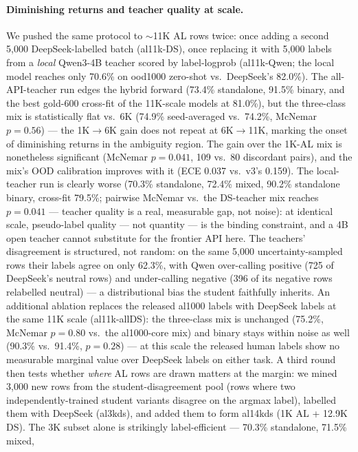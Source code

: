 \documentclass[11pt,a4paper]{article}
\begin{document}
\paragraph{Diminishing returns and teacher quality at scale.} We pushed
the same protocol to $\sim$11K AL rows twice: once adding a second
5{,}000 DeepSeek-labelled batch (al11k-DS), once replacing it with
5{,}000 labels from a \emph{local} Qwen3-4B teacher scored by
label-logprob (al11k-Qwen; the local model reaches only 70.6\% on
ood1000 zero-shot vs.\ DeepSeek's 82.0\%). The all-API-teacher run
edges the hybrid forward (73.4\% standalone, 91.5\% binary, and the
best gold-600 cross-fit of the 11K-scale models at 81.0\%), but the
three-class mix is statistically flat vs.\ 6K (74.9\% seed-averaged
vs.\ 74.2\%, McNemar $p = 0.56$) --- the
1K$\to$6K gain does not repeat at 6K$\to$11K, marking the
onset of diminishing returns in the ambiguity region. The gain over
the 1K-AL mix is nonetheless significant (McNemar $p = 0.041$,
109 vs.\ 80 discordant pairs), and the mix's OOD calibration improves
with it (ECE 0.037 vs.\ v3's 0.159). The local-teacher run is
clearly worse (70.3\% standalone, 72.4\% mixed, 90.2\% standalone
binary, cross-fit 79.5\%; pairwise McNemar vs.\ the DS-teacher mix reaches
$p = 0.041$ --- teacher quality is a real, measurable gap, not noise):
at identical scale, pseudo-label quality --- not
quantity --- is the binding constraint, and a 4B open teacher cannot
substitute for the frontier API here. The teachers' disagreement is
structured, not random: on the same 5{,}000 uncertainty-sampled rows
their labels agree on only 62.3\%, with Qwen over-calling positive
(725 of DeepSeek's neutral rows) and under-calling negative (396 of
its negative rows relabelled neutral) --- a distributional bias the
student faithfully inherits. An additional ablation replaces the
released al1000 labels with DeepSeek labels at the same 11K scale
(al11k-allDS): the three-class mix is unchanged (75.2\%,
McNemar $p = 0.80$ vs.\ the al1000-core mix) and binary stays within
noise as well (90.3\% vs.\ 91.4\%, $p = 0.28$) --- at this scale
the released human labels show no measurable marginal value over
DeepSeek labels on either task. A third round then tests whether \emph{where} AL rows are drawn
matters at the margin: we mined 3{,}000 new rows from the
student-disagreement pool (rows where two independently-trained
student variants disagree on the argmax label), labelled them with
DeepSeek (al3kds), and added them
to form al14kds (1K AL + 12.9K DS). The 3K subset alone is
strikingly label-efficient --- 70.3\% standalone, 71.5\% mixed,
\end{document}

